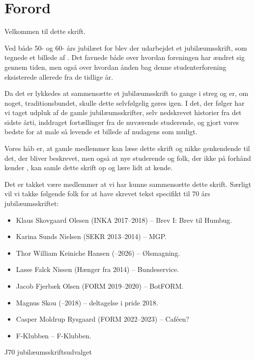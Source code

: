 \chapter*{Forord}
Velkommen til dette skrift.

Ved både 50- og 60- års jubilæet for \TKET blev der udarbejdet et jubilæumsskrift, som tegnede et billede af \TKET. Det favnede både over hvordan foreningen har ændret sig gennem tiden, men også over hvordan ånden bag denne studenterforening eksisterede allerede fra de tidlige år.

Da det er lykkedes at sammensætte et jubilæumsskrift to gange i streg og \TKET er, om noget, traditionsbundet, skulle dette selvfølgelig gøres igen. I det, der følger har vi taget udpluk af de gamle jubilæumsskrifter, selv nedskrevet historier fra det sidste årti, inddraget fortællinger fra de nuværende studerende, og gjort vores bedste for at male så levende et billede af nudagens \TK som muligt.

Vores håb er, at gamle medlemmer kan læse dette skrift og nikke genkendende til det, der bliver beskrevet, men også at nye studerende og folk, der ikke på forhånd kender \TKET{}, kan samle dette skrift op og lære \TKET lidt at kende.%


Det er takket være \TKETs medlemmer at vi har kunne sammensætte dette skrift. Særligt vil vi takke følgende folk for at have skrevet tekst specifikt til 70 års jubilæumsskriftet:
\begin{itemize}
    \item Klaus Skovgaard Olesen (INKA 2017--2018) -- Brev I: Brev til Humbug.
    \item Karina Sunds Nielsen (SEKR 2013--2014) -- MGP.
    \item Thor William Keiniche Hansen (--2026) -- Ølsmagning.
    \item Lasse Falck Nissen (Hænger fra 2014) -- Bundeservice.
    \item Jacob Fjerbæk Olsen (FORM 2019--2020) -- BotFORM.
    \item Magnus Skou (--2018) -- \TKETs deltagelse i pride 2018.
    \item Casper Moldrup Rysgaard (FORM 2022--2023) -- Caféen?
    \item F-Klubben -- F-Klubben.
\end{itemize}

\begin{flushright}
    J70 jubilæumsskriftsudvalget
\end{flushright}
